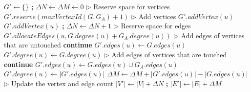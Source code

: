 \begin{algorithm}[hbtp]
\begin{algorithmic}[1]
  \State $G' \gets \{\}$ \textbf{;} $\Delta N \gets \Delta M \gets 0$ \label{alg:add--init}
  \State $\rhd$ Reserve space for vertices
  \State $G'.reserve(maxVertexId(G, G_A) + 1)$ \label{alg:add--reserve}
  \State $\rhd$ Add vertices
   \label{alg:add--add-vertices-begin}
      \State $G'.addVertex(u)$
      \State $G'.addVertex(u)$ \textbf{;} $\Delta N \gets \Delta N + 1$
    \EndIf
  \EndFor \label{alg:add--add-vertices-end}
  \State $\rhd$ Reserve space for edges
   \label{alg:add--reserve-edges-begin}
    \State $G'.allocateEdges(u, G.degree(u) + G_A.degree(u))$
  \EndFor \label{alg:add--reserve-edges-end}
  \State $\rhd$ Add edges of vertices that are untouched
   \label{alg:add--add-edges-untouched-begin}
     \textbf{continue}
    \EndIf
    \State $G'.edges(u) \gets G.edges(u)$
    \State $G'.degree(u) \gets G.degree(u)$
  \EndFor \label{alg:add--add-edges-untouched-end}
  \State $\rhd$ Add edges of vertices that are touched
   \label{alg:add--add-edges-touched-begin}
     \textbf{continue}
    \EndIf
    \State $G'.edges(u) \gets G.edges(u) \cup G_A.edges(u)$
    \State $G'.degree(u) \gets |G'.edges(u)|$
    \State $\Delta M \gets \Delta M + |G'.edges(u)| - |G.edges(u)|$
  \EndFor \label{alg:add--add-edges-touched-end}
  \State $\rhd$ Update the vertex and edge count
  \State $|V'| \gets |V| + \Delta N$ \textbf{;} $|E'| \gets |E| + \Delta M$ \label{alg:add--update}
   \label{alg:add--return}
\EndFunction
\end{algorithmic}
\end{algorithm}

